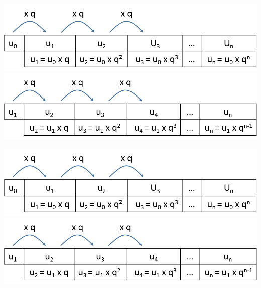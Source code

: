 \documentclass[12pt,a4paper]{article}
\begin{document}
\begin{multicols}{2}
	\includegraphics[scale=0.45]{./img/geo1}
	\includegraphics[scale=0.45]{./img/geo2}
\end{multicols}


\begin{multicols}{2}
	\includegraphics[scale=0.45]{./img/geo1}
	\includegraphics[scale=0.45]{./img/geo2}
\end{multicols}
\end{document}
